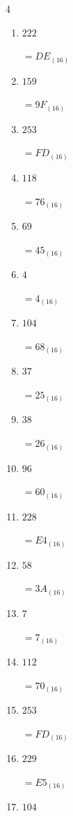 \begin{multicols}{4}
\begin{enumerate}
  \item $222$

        $=DE_{(16)}$

  \item $159$

        $=9F_{(16)}$

  \item $253$

        $=FD_{(16)}$

  \item $118$

        $=76_{(16)}$

  \item $69$

        $=45_{(16)}$

\columnbreak %

  \item $4$

        $=4_{(16)}$

  \item $104$

        $=68_{(16)}$

  \item $37$

        $=25_{(16)}$

  \item $38$

        $=26_{(16)}$

  \item $96$

        $=60_{(16)}$

  \item $228$

        $=E4_{(16)}$

  \item $58$

        $=3A_{(16)}$

  \item $7$

        $=7_{(16)}$

  \item $112$

        $=70_{(16)}$

  \item $253$

        $=FD_{(16)}$

  \item $229$

        $=E5_{(16)}$

  \item $104$


\end{enumerate}
\end{multicols}
